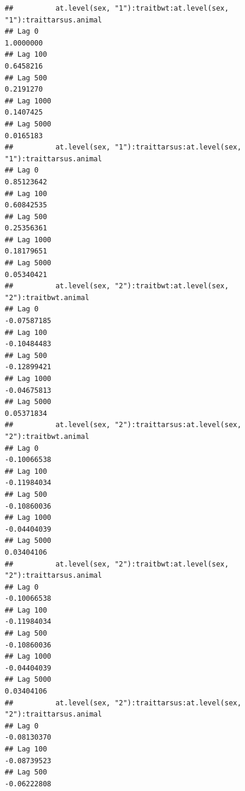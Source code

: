 \documentclass[
  12pt,
]{book}
\begin{document}
\begin{verbatim}
##          at.level(sex, "1"):traitbwt:at.level(sex, "1"):traittarsus.animal
## Lag 0                                                            1.0000000
## Lag 100                                                          0.6458216
## Lag 500                                                          0.2191270
## Lag 1000                                                         0.1407425
## Lag 5000                                                         0.0165183
##          at.level(sex, "1"):traittarsus:at.level(sex, "1"):traittarsus.animal
## Lag 0                                                              0.85123642
## Lag 100                                                            0.60842535
## Lag 500                                                            0.25356361
## Lag 1000                                                           0.18179651
## Lag 5000                                                           0.05340421
##          at.level(sex, "2"):traitbwt:at.level(sex, "2"):traitbwt.animal
## Lag 0                                                       -0.07587185
## Lag 100                                                     -0.10484483
## Lag 500                                                     -0.12899421
## Lag 1000                                                    -0.04675813
## Lag 5000                                                     0.05371834
##          at.level(sex, "2"):traittarsus:at.level(sex, "2"):traitbwt.animal
## Lag 0                                                          -0.10066538
## Lag 100                                                        -0.11984034
## Lag 500                                                        -0.10860036
## Lag 1000                                                       -0.04404039
## Lag 5000                                                        0.03404106
##          at.level(sex, "2"):traitbwt:at.level(sex, "2"):traittarsus.animal
## Lag 0                                                          -0.10066538
## Lag 100                                                        -0.11984034
## Lag 500                                                        -0.10860036
## Lag 1000                                                       -0.04404039
## Lag 5000                                                        0.03404106
##          at.level(sex, "2"):traittarsus:at.level(sex, "2"):traittarsus.animal
## Lag 0                                                             -0.08130370
## Lag 100                                                           -0.08739523
## Lag 500                                                           -0.06222808

\end{verbatim}
\end{document}
